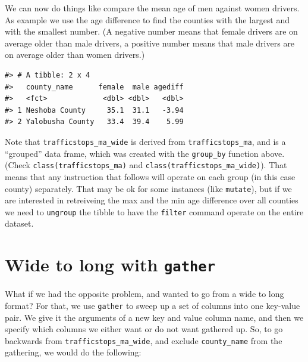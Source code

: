 \documentclass[]{book}
\newenvironment{Shaded}{\begin{snugshade}}{\end{snugshade}}
\newcommand{\DataTypeTok}[1]{\textcolor[rgb]{0.13,0.29,0.53}{#1}}
\newcommand{\KeywordTok}[1]{\textcolor[rgb]{0.13,0.29,0.53}{\textbf{#1}}}
\newcommand{\NormalTok}[1]{#1}
\newcommand{\OperatorTok}[1]{\textcolor[rgb]{0.81,0.36,0.00}{\textbf{#1}}}
\newcommand{\StringTok}[1]{\textcolor[rgb]{0.31,0.60,0.02}{#1}}
\begin{document}
We can now do things like compare the mean age of men against women drivers. As example we use the age difference to find the counties with the largest and with the smallest number. (A negative number means that female drivers are on average older than male drivers, a positive number means that male drivers are on average older than women drivers.)

\begin{Shaded}
\end{Shaded}

\begin{verbatim}
#> # A tibble: 2 x 4
#>   county_name      female  male agediff
#>   <fct>             <dbl> <dbl>   <dbl>
#> 1 Neshoba County     35.1  31.1   -3.94
#> 2 Yalobusha County   33.4  39.4    5.99
\end{verbatim}

Note that \texttt{trafficstops\_ma\_wide} is derived from \texttt{trafficstops\_ma}, and is a ``grouped'' data frame, which was created with the \texttt{group\_by} function above. (Check \texttt{class(trafficstops\_ma)} and \texttt{class(trafficstops\_ma\_wide)}). That means that any instruction that follows will operate on each group (in this case county) separately. That may be ok for some instances (like \texttt{mutate}), but if we are interested in retreiveing the max and the min age difference over all counties we need to \texttt{ungroup} the tibble to have the \texttt{filter} command operate on the entire dataset.

\hypertarget{wide-to-long-with-gather}{%
\section{\texorpdfstring{Wide to long with \texttt{gather}}{Wide to long with gather}}\label{wide-to-long-with-gather}}

What if we had the opposite problem, and wanted to go from a wide to long
format? For that, we use \texttt{gather} to sweep up a set of columns into one
key-value pair. We give it the arguments of a new key and value column name, and
then we specify which columns we either want or do not want gathered up. So, to
go backwards from \texttt{trafficstops\_ma\_wide}, and exclude \texttt{county\_name} from the gathering,
we would do the following:
\end{document}
